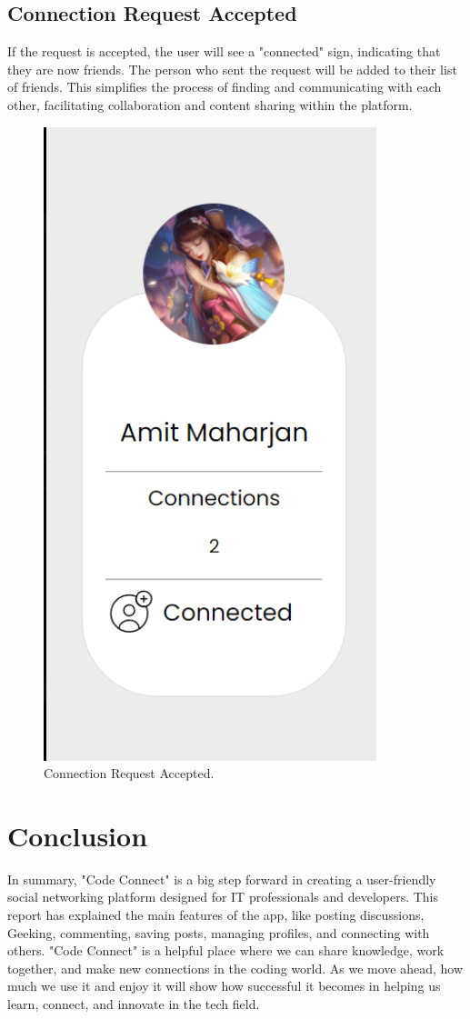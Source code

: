 \subsection{Connection Request Accepted}
If the request is accepted, the user will see a "connected" sign, indicating that they are now friends. The person who sent the request will be added to their list of friends. This simplifies the process of finding and communicating with each other, facilitating collaboration and content sharing within the platform.
\begin{figure}[H]
    \centering
    \includegraphics[height=0.3\textheight]{Outcome-ss/result-after-accepting.png}
    \caption{Connection Request Accepted.}
    \label{fig:Connection Request Accepted}
\end{figure}

\section{Conclusion}
In summary, "Code Connect" is a big step forward in creating a user-friendly social networking platform designed for IT professionals and developers. This report has explained the main features of the app, like posting discussions, Geeking, commenting, saving posts, managing profiles, and connecting with others. "Code Connect" is a helpful place where we can share knowledge, work together, and make new connections in the coding world. As we move ahead, how much we use it and enjoy it will show how successful it becomes in helping us learn, connect, and innovate in the tech field.

